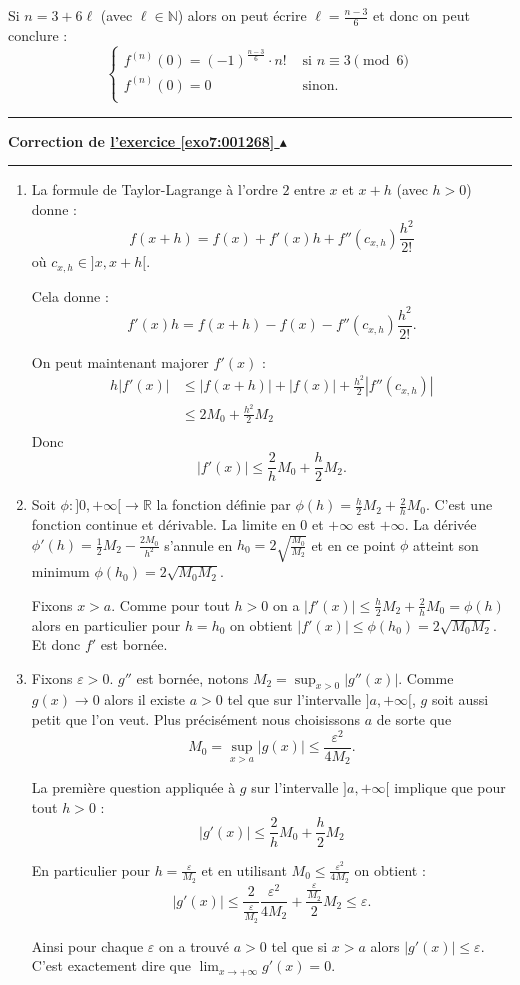 \documentclass[11pt,a4paper]{article}
\newcommand{\Nn}{\mathbb{N}} \newcommand{\N}{\mathbb{N}}
\newcommand{\Rr}{\mathbb{R}} \newcommand{\R}{\mathbb{R}}
\renewcommand{\epsilon}{\varepsilon}
\renewcommand{\le}{\leqslant} \renewcommand{\leq}{\leqslant}
\newcounter{exo}
\newcommand{\correction}[1]{\hypertarget{cor7:#1}{}\label{cor7:#1}{\bf Correction de \hyperlink{exo7:#1}{l'exercice \ref{exo7:#1} $\blacktriangle$}}\vspace{1mm}\hrule\vspace{1mm}}
\newcommand{\fincorrection}{\vspace{1mm}\hrule\vspace*{7mm}}
\begin{document}
Si $n=3+6\ell$ (avec $\ell\in \Nn$) alors on peut écrire $\ell = \frac{n-3}{6}$
et donc on peut conclure :
$$\begin{cases}
f^{(n)}(0) = (-1)^{\frac{n-3}{6}} \cdot n! & \text{ si } n \equiv 3 \pmod{6} \\
f^{(n)}(0) = 0         & \text{ sinon.} \\    
\end{cases}$$
\fincorrection
\correction{001268}
\begin{enumerate}
  \item La formule de Taylor-Lagrange à l'ordre $2$ entre $x$ et $x+h$ (avec $h>0$) donne :
$$f(x+h) = f(x) + f'(x) h  + f''(c_{x,h}) \frac{h^2}{2!} $$
où $c_{x,h} \in ]x,x+h[$.

Cela donne :
$$f'(x) h = f(x+h) - f(x)  - f''(c_{x,h}) \frac{h^2}{2!}.$$

On peut maintenant majorer $f'(x)$ :
\begin{align*}
h|f'(x)| 
   & \le \left|f(x+h) \right| + \left| f(x) \right| + \frac{h^2}{2}\left| f''(c_{x,h})\right|  \\
   & \le 2M_0 + \frac {h^2}{2} M_2 \\
\end{align*}
Donc
$$|f'(x)|\le \frac{2}{h}{M_0} + \frac{h}{2}M_2.$$

  \item Soit $\phi : ]0,+\infty[ \rightarrow \Rr$ la fonction définie par $\phi(h) = \frac {h}{2}M_2+\frac{2}{h}M_0$.
C'est une fonction continue et dérivable. La limite en $0$ et $+\infty$ est $+\infty$.
La dérivée $\phi'(h)=\frac12 M_2-\frac{2M_0}{h^2}$ s'annule en $h_0 = 2\sqrt{\frac{M_0}{M_2}}$ et en ce point 
$\phi$ atteint son minimum
$\phi(h_0) = 2\sqrt{M_0M_2}$.

Fixons $x>a$. Comme pour tout $h>0$ on a $|f'(x)| \le \frac {h}{2}M_2+\frac{2}{h}M_0 =\phi(h)$ alors en particulier pour 
$h=h_0$ on obtient $|f'(x)| \le \phi(h_0)= 2\sqrt{M_0M_2}$. Et donc $f'$ est bornée.

  \item Fixons $\epsilon >0$. $g''$ est bornée, notons $M_2 = \sup_{x> 0}\vert g''(x)\vert$. Comme $g(x)\to 0$ alors il 
existe $a>0$ tel que sur l'intervalle $]a,+\infty[$, $g$ soit aussi petit que l'on veut. Plus précisément nous choisissons $a$ de sorte que 
$$M_0 = \sup_{x>a}\vert g(x)\vert \le \frac{\epsilon^2}{4M_2}.$$


La première question appliquée à $g$ sur l'intervalle $]a,+\infty[$ implique 
que pour tout $h>0$ : 
$$|g'(x)| \le  \frac{2}{h}M_0 + \frac {h}{2} M_2 $$

En particulier pour $h = \frac{\epsilon}{M_2}$ et en utilisant $M_0  \le \frac{\epsilon^2}{4M_2}$
on obtient :
$$|g'(x)| \le  \frac{2}{\frac{\epsilon}{M_2}}\frac{\epsilon^2}{4M_2} + \frac{\frac{\epsilon}{M_2}}{2} M_2 \le \epsilon.$$

Ainsi pour chaque $\epsilon$ on a trouvé $a>0$ tel que si $x>a$ alors $|g'(x)|\le \epsilon$.
C'est exactement dire que $\lim_{x\to+\infty} g'(x)=0$.

\end{enumerate}
\end{document}
